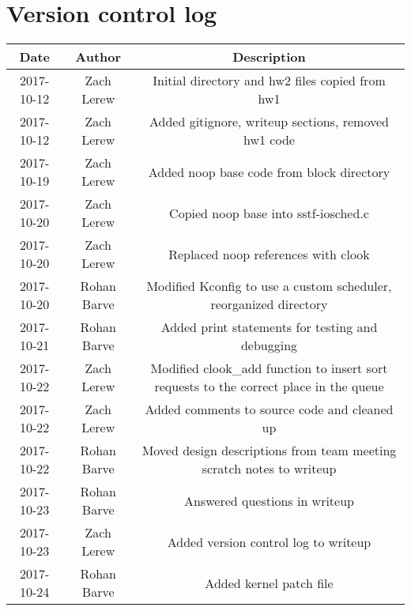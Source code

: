 \documentclass[letterpaper,10pt,fleqn]{article}
\begin{document}
	\section*{Version control log}
	\begin{center}
				\begin{tabular}{ |c|c|c| }
					\hline
					Date & Author & Description \\
					\hline
					2017-10-12 & Zach Lerew & Initial directory and hw2 files copied from hw1 \\
					2017-10-12 & Zach Lerew & Added gitignore, writeup sections, removed hw1 code \\
					2017-10-19 & Zach Lerew & Added noop base code from block directory \\
					2017-10-20 & Zach Lerew & Copied noop base into sstf-iosched.c \\
					2017-10-20 & Zach Lerew & Replaced noop references with clook \\
					2017-10-20 & Rohan Barve & Modified Kconfig to use a custom scheduler, reorganized directory \\
					2017-10-21 & Rohan Barve & Added print statements for testing and debugging \\
					2017-10-22 & Zach Lerew & Modified clook\_add function to insert sort requests to the correct place in the queue \\
					2017-10-22 & Zach Lerew & Added comments to source code and cleaned up\\
					2017-10-22 & Rohan Barve & Moved design descriptions from team meeting scratch notes to writeup \\
					2017-10-23 & Rohan Barve & Answered questions in writeup \\
					2017-10-23 & Zach Lerew & Added version control log to writeup \\
					2017-10-24 & Rohan Barve & Added kernel patch file \\

					\hline
				\end{tabular}
			\end{center}
\end{document}
